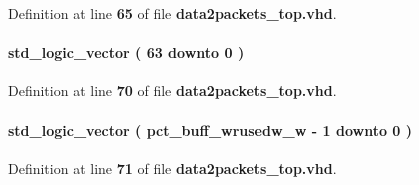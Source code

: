 Definition at line {\bf 65} of file {\bf data2packets\+\_\+top.\+vhd}.

\paragraph[{inst2\+\_\+pct\+\_\+q}]{ {\bfseries \textcolor{comment}{std\+\_\+logic\+\_\+vector}\textcolor{vhdlchar}{ }\textcolor{vhdlchar}{(}\textcolor{vhdlchar}{ }\textcolor{vhdlchar}{ } \textcolor{vhdldigit}{63} \textcolor{vhdlchar}{ }\textcolor{keywordflow}{downto}\textcolor{vhdlchar}{ }\textcolor{vhdlchar}{ } \textcolor{vhdldigit}{0} \textcolor{vhdlchar}{ }\textcolor{vhdlchar}{)}\textcolor{vhdlchar}{ }} \hspace{0.3cm}{\ttfamily [Signal]}}\label{classdata2packets__top_1_1arch_accc5ceef8b824c71bdc804740916aa75}


Definition at line {\bf 70} of file {\bf data2packets\+\_\+top.\+vhd}.

\paragraph[{inst2\+\_\+pct\+\_\+size}]{ {\bfseries \textcolor{comment}{std\+\_\+logic\+\_\+vector}\textcolor{vhdlchar}{ }\textcolor{vhdlchar}{(}\textcolor{vhdlchar}{ }\textcolor{vhdlchar}{ }\textcolor{vhdlchar}{ }\textcolor{vhdlchar}{ }{\bfseries {\bf pct\+\_\+buff\+\_\+wrusedw\+\_\+w}} \textcolor{vhdlchar}{-\/}\textcolor{vhdlchar}{ } \textcolor{vhdldigit}{1} \textcolor{vhdlchar}{ }\textcolor{keywordflow}{downto}\textcolor{vhdlchar}{ }\textcolor{vhdlchar}{ } \textcolor{vhdldigit}{0} \textcolor{vhdlchar}{ }\textcolor{vhdlchar}{)}\textcolor{vhdlchar}{ }} \hspace{0.3cm}{\ttfamily [Signal]}}\label{classdata2packets__top_1_1arch_a3af1dd85a2ae32adb03dc52babffc5da}


Definition at line {\bf 71} of file {\bf data2packets\+\_\+top.\+vhd}.

